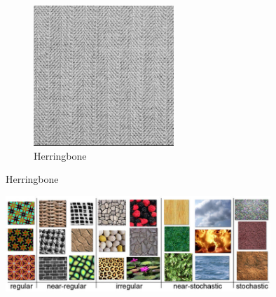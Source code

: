 \documentclass{beamer}
\begin{document}
\begin{frame}
\begin{figure}[h]
\begin{subfigure}[b]{0.4\textwidth}
                \includegraphics[width=\textwidth]{herringbone}
                \caption{Herringbone}
                \label{fig:mm}
        \end{subfigure}
\end{figure}

\end{frame}

\begin{frame}
  \begin{figure}[h]
    \centering
    \includegraphics[width = 10cm]{stoc}
  \end{figure}

\end{frame}
\end{document}
